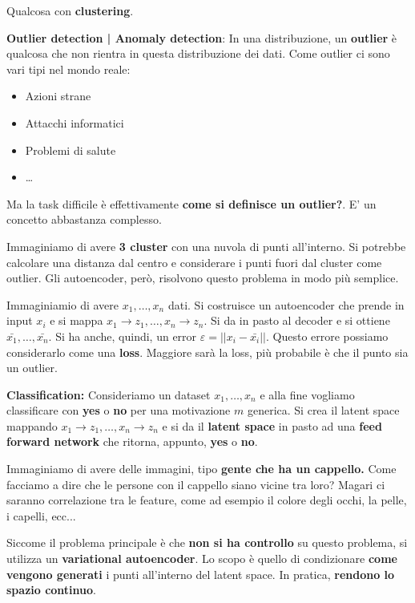 Qualcosa con \textbf{clustering}.

\textbf{Outlier detection | Anomaly detection}: In una distribuzione, un \textbf{outlier} è qualcosa che non rientra in questa distribuzione dei dati. Come outlier ci sono vari tipi
nel mondo reale:
\begin{itemize}
    \item Azioni strane
    \item Attacchi informatici
    \item Problemi di salute
    \item \dots
\end{itemize}

Ma la task difficile è effettivamente \textbf{come si definisce un outlier?}.
E' un concetto abbastanza complesso.

Immaginiamo di avere \textbf{3 cluster} con una nuvola di punti all'interno. Si
potrebbe calcolare una distanza dal centro e considerare i punti fuori dal
cluster come outlier. Gli autoencoder, però, risolvono questo problema in modo
più semplice.

Immaginiamio di avere $x_1, \dots, x_n$ dati. Si costruisce un autoencoder che
prende in input $x_i$ e si mappa $x_1 \rightarrow z_1, \dots, x_n \rightarrow
    z_n$. Si da in pasto al decoder e si ottiene $\bar{x_1}, \dots, \bar{x_n}$. Si
ha anche, quindi, un error $\varepsilon = ||x_i - \bar{x_i}||$. Questo errore
possiamo considerarlo come una \textbf{loss}. Maggiore sarà la loss, più
probabile è che il punto sia un outlier.

\textbf{Classification:} Consideriamo un dataset $x_1, \dots, x_n$ e alla fine vogliamo classificare con \textbf{yes} o \textbf{no} per una motivazione $m$ generica.
Si crea il latent space mappando $x_1 \rightarrow z_1, \dots, x_n \rightarrow z_n$ e si da il \textbf{latent space} in pasto ad una \textbf{feed forward network} che ritorna, appunto, \textbf{yes} o \textbf{no}.

Immaginiamo di avere delle immagini, tipo \textbf{gente che ha un cappello.}
Come facciamo a dire che le persone con il cappello siano vicine tra loro?
Magari ci saranno correlazione tra le feature, come ad esempio il colore degli
occhi, la pelle, i capelli, ecc...

Siccome il problema principale è che \textbf{non si ha controllo} su questo
problema, si utilizza un \textbf{variational autoencoder}. Lo scopo è quello di
condizionare \textbf{come vengono generati} i punti all'interno del latent
space. In pratica, \textbf{rendono lo spazio continuo}.

